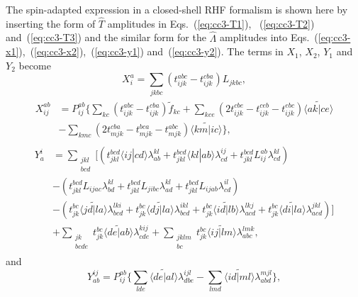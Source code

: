 The spin-adapted expression in a closed-shell RHF formalism is shown here by inserting the form of $\hat{T}$  amplitudes in Eqs.~(\ref{eq:cc3-T1}), ~(\ref{eq:cc3-T2}) and~(\ref{eq:cc3-T3}) and the similar form for the $\hat{\Lambda}$ amplitudes into Eqs.~(\ref{eq:cc3-x1}),~(\ref{eq:cc3-x2}),~(\ref{eq:cc3-y1}) and~(\ref{eq:cc3-y2}). The terms in $X_{1}$, $X_{2}$, $Y_{1}$ and $Y_{2}$ become
\begin{equation}
X_{i}^{a}= \sum_{jkbc}(t_{ijk}^{abc}-t_{ijk}^{cba})L_{jkbc},
\label{eq:cc3-x1-exp}
\end{equation}
\begin{align}
\begin{split}
X_{ij}^{ab}&=P_{ij}^{ab}\{\sum_{kc}(t_{ijk}^{abc}-t_{ijk}^{cba})\tilde{f}_{kc} + \sum_{kce}(2t_{ijk}^{cbe}-t_{ijk}^{ceb}-t_{ijk}^{ebc}) \tilde{\langle ak|ce \rangle} \\
 &- \sum_{kmc}(2t_{mjk}^{cba}-t_{mjk}^{bca}-t_{mjk}^{abc}) \tilde{\langle km|ic \rangle} \},
\label{eq:cc3-x2-exp}
\end{split}
\end{align}
\begin{align}
\begin{split}
Y_{a}^{i} &= \sum\limits_{\substack{jkl\\bcd}}[(t_{jkl}^{bcd}\langle ij|cd \rangle \lambda_{ab}^{kl} + t_{jkl}^{bcd} \langle kl|ab \rangle \lambda_{cd}^{ij}+ t_{jkl}^{bcd}L_{ij}^{ab}\lambda_{cd}^{kl}) \\
 &-(t_{jkl}^{bcd}L_{ijac}\lambda_{bd}^{kl} + t_{jkl}^{bcd}L_{jibc}\lambda_{ad}^{kl} + t_{jkl}^{bcd}L_{ijab}\lambda_{cd}^{il})\\
 &-(t_{jk}^{bc} \tilde{\langle jd|la \rangle} \lambda_{bcd}^{lki} + t_{jk}^{bc} \tilde{\langle dj|la \rangle} \lambda_{bcd}^{ikl} 
   + t_{jk}^{bc} \tilde{\langle id|lb \rangle} \lambda_{acd}^{lkj} + t_{jk}^{bc} \tilde{\langle di|la \rangle} \lambda_{acd}^{jkl})] \\
 &+\sum\limits_{\substack{jk\\bcde}} t_{jk}^{bc} \tilde{\langle de|ab \rangle} \lambda_{cde}^{kij}
   +\sum\limits_{\substack{jklm\\bc}}t_{jk}^{bc} \tilde{\langle ij|lm \rangle} \lambda_{abc}^{lmk},
\label{eq:cc3-y1-exp}
\end{split}
\end{align}
and
\begin{equation}
Y_{ab}^{ij}= P_{ij}^{ab} \{ \sum_{lde} \tilde{\langle de|al \rangle} \lambda_{dbe}^{ijl} -  \sum_{lmd} \tilde{\langle id|ml \rangle} \lambda_{abd}^{mjl} \},
\label{eq:cc3-y2-exp}
\end{equation}
